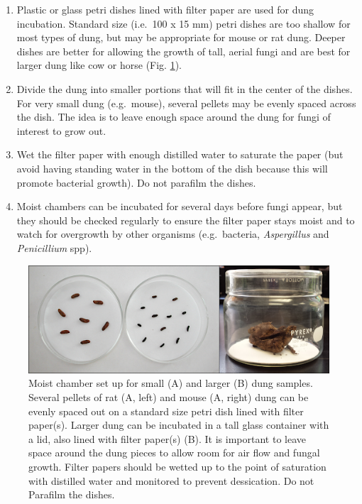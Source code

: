 \documentclass[]{book}
\providecommand{\tightlist}{%
  \setlength{\itemsep}{0pt}\setlength{\parskip}{0pt}}
\begin{document}
\begin{enumerate}
\def\labelenumi{\arabic{enumi}.}
\tightlist
\item
  Plastic or glass petri dishes lined with filter paper are used for
  dung incubation. Standard size (i.e.~100 x 15 mm) petri dishes are too
  shallow for most types of dung, but may be appropriate for mouse or
  rat dung. Deeper dishes are better for allowing the growth of tall,
  aerial fungi and are best for larger dung like cow or horse (Fig.
  \ref{fig:ch2fig3}).
\item
  Divide the dung into smaller portions that will fit in the center of
  the dishes. For very small dung (e.g.~mouse), several pellets may be
  evenly spaced across the dish. The idea is to leave enough space
  around the dung for fungi of interest to grow out.
\item
  Wet the filter paper with enough distilled water to saturate the paper
  (but avoid having standing water in the bottom of the dish because
  this will promote bacterial growth). Do not parafilm the dishes.
\item
  Moist chambers can be incubated for several days before fungi appear,
  but they should be checked regularly to ensure the filter paper stays
  moist and to watch for overgrowth by other organisms (e.g.~bacteria,
  \emph{Aspergillus} and \emph{Penicillium} spp).
\end{enumerate}

\begin{figure}

{\centering \includegraphics[width=6.83in]{img/Fig3_Ch2} 

}

\caption{Moist chamber set up for small (A) and larger (B) dung samples.  Several pellets of rat (A, left) and mouse (A, right) dung can be evenly spaced out on a standard size petri dish lined with filter paper(s).  Larger dung can be incubated in a tall glass container with a lid, also lined with filter paper(s) (B).  It is important to leave space around the dung pieces to allow room for air flow and fungal growth.  Filter papers should be wetted up to the point of saturation with distilled water and monitored to prevent dessication.  Do not Parafilm the dishes.}\label{fig:ch2fig3}
\end{figure}
\end{document}
